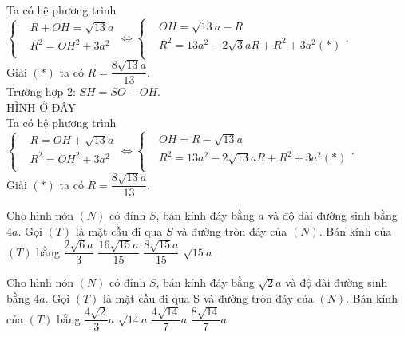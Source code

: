\begin{ex}
{		Ta có hệ phương trình\\
		$\left\{\begin{aligned}
			& R+OH=\sqrt{13}a\\ 
			&{R^2}=O{H^2}+3a^2\\ 
		\end{aligned}\right.\Leftrightarrow\left\{\begin{aligned}
			& OH=\sqrt{13}a-R\\ 
			&{R^2}=13a^2-2\sqrt{3}aR+R^2+3a^2(*)\\ 
		\end{aligned}\right.$.\\
		Giải $(*)$ ta có $R=\dfrac{8\sqrt{13}a}{13}$.\\
		Trường hợp 2: $SH=SO-OH$.\\
		{\color{red}HÌNH Ở ĐÂY}\\
		Ta có hệ phương trình $\left\{\begin{aligned}
			& R=OH+\sqrt{13}a\\ 
			&{R^2}=O{H^2}+3a^2\\ 
		\end{aligned}\right.\Leftrightarrow\left\{\begin{aligned}
			& OH=R-\sqrt{13}a\\ 
			&{R^2}=13a^2-2\sqrt{13}aR+R^2+3a^2(*)\\ 
		\end{aligned}\right.$.\\
		Giải $(*)$ ta có $R=\dfrac{8\sqrt{13}a}{13}$.
	}
\end{ex}
\begin{ex}[Mã 103 - 2020 Lần 2]%
	Cho hình nón $(N)$ có đỉnh $S$, bán kính đáy bằng $a$ và độ dài đường sinh bằng $4a$. Gọi $(T)$ là mặt cầu đi qua $S$ và đường tròn đáy của $(N)$. Bán kính của $(T)$ bằng
	\choice
	{$\dfrac{2\sqrt{6}a}{3}$}
	{$\dfrac{16\sqrt{15}a}{15}$}
	{\True $\dfrac{8\sqrt{15}a}{15}$}
	{$\sqrt{15}a$}
\end{ex}
\begin{ex}
	[Mã 101 - 2020 Lần 2]%
	Cho hình nón $(N)$ có đỉnh $S$, bán kính đáy bằng $\sqrt{2}a$ và độ dài đường sinh bằng $4a$. Gọi $(T)$ là mặt cầu đi qua S và đường tròn đáy của $(N)$. Bán kính của $(T)$ bằng
	\choice
	{$\dfrac{4\sqrt{2}}{3}a$}
	{$\sqrt{14}a$}
	{\True $\dfrac{4\sqrt{14}}{7}a$}
	{$\dfrac{8\sqrt{14}}{7}a$}
\end{ex}
